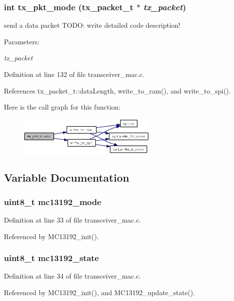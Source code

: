 \subsubsection{\setlength{\rightskip}{0pt plus 5cm}int tx\_\-pkt\_\-mode ({\bf tx\_\-packet\_\-t} $\ast$ {\em tx\_\-packet})}\label{group__ro__transceiver__mac_g4a51cc343802a2c66a234e3d5b74f25c}


send a data packet TODO: write detailed code description! 

\begin{Desc}
\item[Parameters:]
\begin{description}
\item[{\em tx\_\-packet}]\end{description}
\end{Desc}


Definition at line 132 of file transceiver\_\-mac.c.

References tx\_\-packet\_\-t::data\-Length, write\_\-to\_\-ram(), and write\_\-to\_\-spi().

Here is the call graph for this function:\begin{figure}[H]
\begin{center}
\leavevmode
\includegraphics[width=194pt]{group__ro__transceiver__mac_g4a51cc343802a2c66a234e3d5b74f25c_cgraph}
\end{center}
\end{figure}


\subsection{Variable Documentation}
\subsubsection{\setlength{\rightskip}{0pt plus 5cm}uint8\_\-t {\bf mc13192\_\-mode}}\label{group__ro__transceiver__mac_gb358a2092e31591e6d721330d453c425}




Definition at line 33 of file transceiver\_\-mac.c.

Referenced by MC13192\_\-init().
\subsubsection{\setlength{\rightskip}{0pt plus 5cm}uint8\_\-t {\bf mc13192\_\-state}}\label{group__ro__transceiver__mac_g553f7a0964d662b41a5fd9d9d782bdd2}




Definition at line 34 of file transceiver\_\-mac.c.

Referenced by MC13192\_\-init(), and MC13192\_\-update\_\-state().